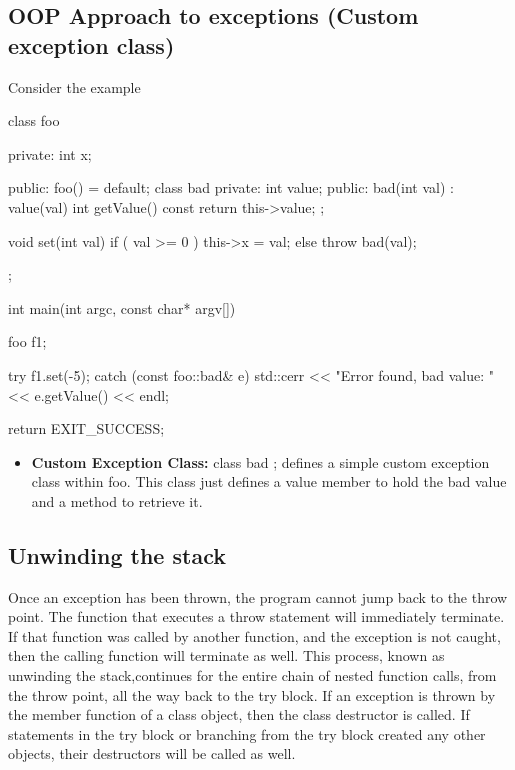 \documentclass{report}
\begin{document}
    \subsection{OOP Approach to exceptions (Custom exception class)}
    \bigbreak \noindent 
    Consider the example\bigbreak \noindent 
    \begin{cppcode}
        class foo {
            private:
            int x;

            public:
            foo() = default;
            class bad { 
                private:
                    int value;
                public:
                    bad(int val) : value(val) {}
                    int getValue() const { return this->value; }
            };

            void set(int val) {
                if ( val >= 0 ) { this->x = val;} 
                else { throw bad(val); }
            }
        };

        int main(int argc, const char* argv[]) { 
            foo f1;

            try {
                f1.set(-5);
            } catch (const foo::bad& e) {
                std::cerr << "Error found, bad value: " << e.getValue() << endl;
            }

            return EXIT_SUCCESS; 
        }
    \end{cppcode}
    \bigbreak \noindent 
    \begin{itemize}
        \item \textbf{Custom Exception Class:} class bad {}; defines a simple custom exception class within foo. This class just defines a value member to hold the bad value and a method to retrieve it.
    \end{itemize}

    \pagebreak 
    \subsection{Unwinding the stack}
    \bigbreak \noindent 
    \begin{concept}
        Once an exception has been thrown, the program cannot jump back to the throw point.
        The function that executes a throw statement will immediately terminate. If that function was called by another function, and the exception is not caught, then the calling
        function will terminate as well. This process, known as unwinding the stack,continues
        for the entire chain of nested function calls, from the throw point, all the way back to
        the try block.
        \bigbreak \noindent 
        If an exception is thrown by the member function of a class object, then the class destructor
        is called. If statements in the try block or branching from the try block created any other
        objects, their destructors will be called as well. 
    \end{concept}
\end{document}
